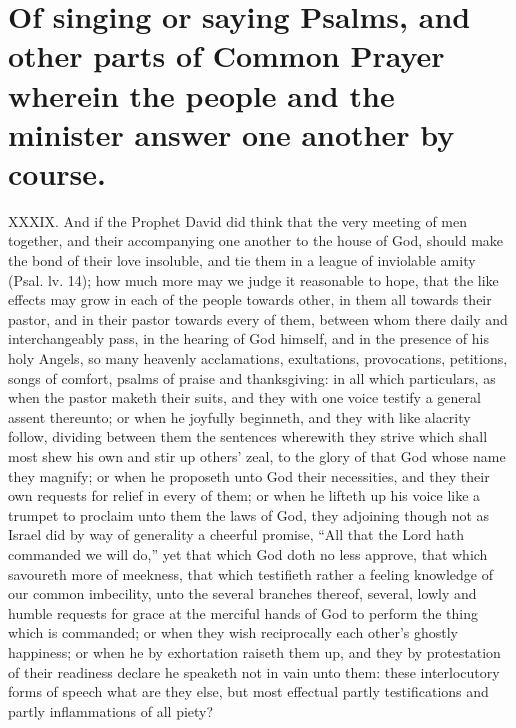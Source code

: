 \section*{Of singing or saying Psalms, and other parts of Common Prayer wherein the people and the minister answer one another by course.}
XXXIX. And if the Prophet David did think that the very meeting of men together, and their accompanying one another to the house of God, should make the bond of their love insoluble, and tie them in a league of inviolable amity (Psal. lv. 14); how much more may we judge it reasonable to hope, that the like effects may grow in each of the people towards other, in them all towards their pastor, and in their pastor towards every of them, between whom there daily and interchangeably pass, in the hearing of God himself, and in the presence of his holy Angels, so many heavenly acclamations, exultations, provocations, petitions, songs of comfort, psalms of praise and thanksgiving: in all which particulars, as when the pastor maketh their suits, and they with one voice testify a general assent thereunto; or when he joyfully beginneth, and they with like alacrity follow, dividing between them the sentences wherewith they strive which shall most shew his own and stir up others’ zeal, to the glory of that God whose name they magnify; or when he proposeth unto God their necessities, and they their own requests for relief in every of them; or when he lifteth up his voice like a trumpet to proclaim unto them the laws of God, they adjoining though not as Israel did by way of generality a cheerful promise, “All that the Lord hath commanded we will do,” yet that which God doth no less approve, that which savoureth more of meekness, that which testifieth rather a feeling knowledge of our common imbecility, unto the several  branches thereof, several, lowly and humble requests for grace at the merciful hands of God to perform the thing which is commanded; or when they wish reciprocally each other’s ghostly happiness; or when he by exhortation raiseth them up, and they by protestation of their readiness declare he speaketh not in vain unto them: these interlocutory forms of speech what are they else, but most effectual partly testifications and partly inflammations of all piety?
